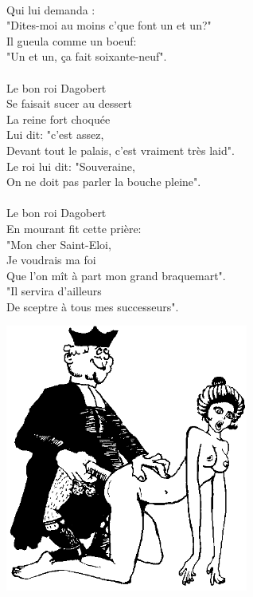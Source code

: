\\Qui lui demanda :
\\"Dites-moi au moins c'que font un et un?"
\\Il gueula comme un boeuf:
\\"Un et un, ça fait soixante-neuf".
\\\\Le bon roi Dagobert
\\Se faisait sucer au dessert
\\La reine fort choquée
\\Lui dit: "c'est assez,
\\Devant tout le palais, c'est vraiment très laid".
\\Le roi lui dit: "Souveraine,
\\On ne doit pas parler la bouche pleine".
\\\\Le bon roi Dagobert
\\En mourant fit cette prière:
\\"Mon cher Saint-Eloi,
\\Je voudrais ma foi
\\Que l'on mît à part mon grand braquemart".
\\"Il servira d'ailleurs
\\De sceptre à tous mes successeurs".
\begin{center}
   \includegraphics[width=0.6\textwidth]{images/dagobert.png}
 \end{center}
\breakpage